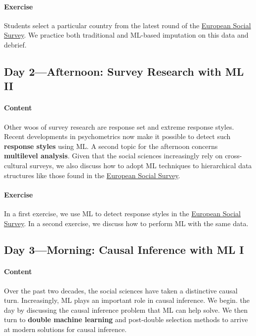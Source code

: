 \documentclass{article}
\begin{document}
\paragraph{Exercise}
Students select a particular country from the latest round of the \href{https://www.europeansocialsurvey.org/}{European Social Survey}. We practice both traditional and ML-based imputation on this data and debrief.

\subsection{Day 2---Afternoon: Survey Research with ML II}
\paragraph{Content}
Other woos of survey research are response set and extreme response styles. Recent developments in psychometrics now make it possible to detect such \textbf{response styles} using ML. A second topic for the afternoon concerns \textbf{multilevel analysis}. Given that the social sciences increasingly rely on cross-cultural surveys, we also discuss how to adopt ML techniques to hierarchical data structures like those found in the \href{https://www.europeansocialsurvey.org/}{European Social Survey}.

\paragraph{Exercise}
In a first exercise, we use ML to detect response styles in the \href{https://www.europeansocialsurvey.org/}{European Social Survey}. In a second exercise, we discuss how to perform ML with the same data.

\subsection{Day 3---Morning: Causal Inference with ML I}
\paragraph{Content}
Over the past two decades, the social sciences have taken a distinctive causal turn. Increasingly, ML plays an important role in causal inference. We begin. the day by discussing the causal inference problem that ML can help solve. We then turn to \textbf{double machine learning} and post-double selection methods to arrive at modern solutions for causal inference.
\end{document}
